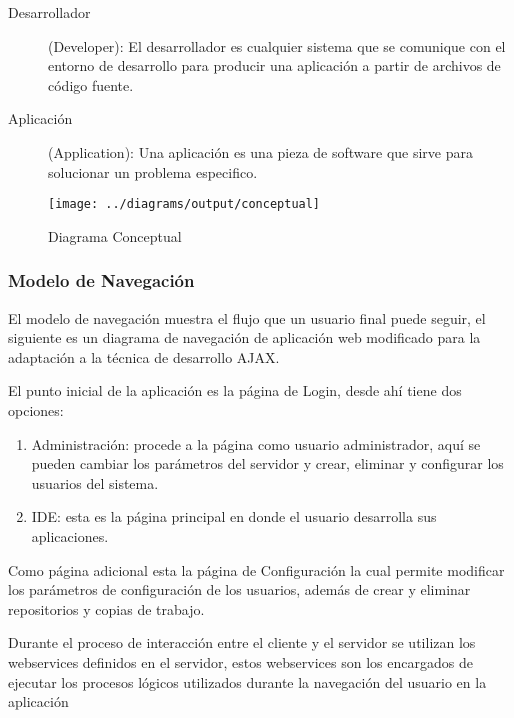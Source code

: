 \begin{description}
	\item [Desarrollador](Developer): \newline
	El desarrollador es cualquier sistema que se comunique con el entorno de desarrollo para producir una aplicación a partir de archivos de código fuente.
	
	\item [Aplicación](Application): \newline
	Una aplicación es una pieza de software que sirve para solucionar un problema especifico.
	
\end{description}

\begin{landscape}
\begin{figure}
 \centering
 \texttt{[image: ../diagrams/output/conceptual]}
 \caption{Diagrama Conceptual}
 \label{diagrama:conceptual}
\end{figure}
\end{landscape}


\subsubsection{Modelo de Navegación}

El modelo de navegación muestra el flujo que un usuario final puede seguir, el siguiente es un diagrama de navegación de aplicación web modificado para la adaptación a la técnica de desarrollo AJAX.

El punto inicial de la aplicación es la página de Login, desde ahí tiene dos opciones:

\begin{enumerate}
	
	\item Administración: procede a la página como usuario administrador, aquí se pueden cambiar los parámetros del servidor y crear, eliminar y configurar los usuarios del sistema.
	
	\item IDE: esta es la página principal en donde el usuario desarrolla sus aplicaciones.
	
\end{enumerate}

Como página adicional esta la página de Configuración la cual permite modificar los parámetros de configuración de los usuarios, además de crear y eliminar repositorios y copias de trabajo.

Durante el proceso de interacción entre el cliente y el servidor se utilizan los webservices definidos en el servidor, estos webservices son los encargados de ejecutar los procesos lógicos utilizados durante la navegación del usuario en la aplicación

